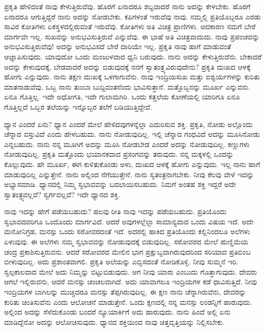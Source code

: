 ಪ್ರಕೃತಿ ಹೇಳಿದಂತೆ ನಾವು ಕೇಳುತ್ತಿರುವೆವು. ಹೊರಗೆ ಏನಾದರೂ ಶಬ್ದವಾದರೆ ನಾನು ಅದನ್ನು ಕೇಳಬೇಕು. ಹೊರಗೆ ಏನಾದರೂ ಆಗುತ್ತಿದ್ದರೆ ನಾನು ಅದನ್ನು ನೋಡಬೇಕು. ಕಪಿಗಳಂತೆ ಇರುವೆವು ನಾವು. ನಮ್ಮಲ್ಲಿ ಪ್ರತಿಯೊಬ್ಬರೂ ಎರಡು ಸಾವಿರ ಕೋತಿಗಳು ಏಕಸ್ಥಳದಲ್ಲಿರುವಂತೆ ಇರುವೆವು. ಕೋತಿಗಳು ಅತಿ ವಿಚಿತ್ರ ಪ್ರಾಣಿಗಳು. ಆದಕಾರಣ ನಮಗೆ ಬೇರೆ ಮಾರ್ಗವೇ ಇಲ್ಲ. ಸುಖವನ್ನು ಅನುಭವಿಸುತ್ತಿರುವೆ ಎನ್ನುವೆವು. ಈ ಭಾಷೆ ಅತಿ ವಿಚಿತ್ರವಾದುದು. ನಾವು ಪ್ರಪಂಚವನ್ನು ಅನುಭವಿಸುತ್ತಿರುವೆವು! ಅದನ್ನು ಅನುಭವಿಸದೆ ಬೇರೆ ದಾರಿಯೇ ಇಲ್ಲ. ಪ್ರಕೃತಿ ನಾವು ಹಾಗೆ ಮಾಡುವಂತೆ ಆಜ್ಞಾಪಿಸುವುದು. ಯಾವುದೋ ಒಂದು ಮಂಜುಳವಾದ ಧ್ವನಿ ಬರುವುದು. ನಾನು ಅದನ್ನು ಕೇಳುತ್ತಿರುವೆನು. ಬೇಕಾದರೆ ಅದನ್ನು ಕೇಳುವುದಕ್ಕೆ, ಬೇಡವಾದರೆ ಅದನ್ನು ಬಿಡುವುದಕ್ಕೆ ನನಗೆ ಸ್ವಾತಂತ್ರ್ಯವಿರುವುದೇನು? ಪ್ರಕೃತಿ ದುಃಖದ ಆಳಕ್ಕೆ ಹೋಗು ಎನ್ನುವುದು. ನಾನು ತಕ್ಷಣ ದುಃಖಕ್ಕೆ ಒಳಗಾಗುವೆನು. ನಾವು ಇಂದ್ರಿಯಸುಖ ಮತ್ತು ಐಶ್ವರ್ಯಗಳನ್ನು ಕುರಿತು ಮಾತನಾಡುವೆವು. ಒಬ್ಬ ನಾನು ತುಂಬಾ ಬುದ್ದಿವಂತನೆಂದು ಭಾವಿಸುತ್ತಾನೆ. ಮತ್ತೊಬ್ಬನನ್ನು ಮೂರ್ಖ ಎನ್ನುವನು. ಏನೂ ಗೊತ್ತಿಲ್ಲ. ಇದೇ ಅಧೋಗತಿ, ಇದೇ ಗುಲಾಮಗಿರಿ. ಒಂದು ಕತ್ತಲೆಯ ಕೋಣೆಯಲ್ಲಿ ಯಾರಿಗೂ ಏನೂ ಗೊತ್ತಿಲ್ಲದೆ ಒಬ್ಬರ ತಲೆಯನ್ನು ಇನ್ನೊಬ್ಬರ ತಲೆಗೆ ಬಡಿಯುತ್ತಿದ್ದೇವೆ.

ಧ್ಯಾನ ಎಂದರೆ ಏನು? ಧ್ಯಾನ ಎಂದರೆ ಮೇಲೆ ಹೇಳಿದವುಗಳನ್ನೆಲ್ಲಾ ಎದುರಿಸುವ ಶಕ್ತಿ. ಪ್ರಕೃತಿ, ನೋಡು ಅಲ್ಲೊಂದು ಚೆನ್ನಾದ ವಸ್ತುವಿದೆ ಎಂದು ಹೇಳಬಹುದು. ನಾನು ನೋಡುವುದಿಲ್ಲ. ಇಲ್ಲಿ ಚೆನ್ನಾದ ಗಂಧವಿದೆ ಅದನ್ನು ಮೂಸಿನೋಡು ಎನ್ನಬಹುದು. ನಾನು ನನ್ನ ಮೂಗಿಗೆ ಅದನ್ನು ಮೂಸಿ ನೋಡಬೇಡ ಎಂದರೆ ಅದನ್ನು ನೋಡುವುದಿಲ್ಲ. ಕಣ್ಣುಗಳು ನೋಡುವುದಿಲ್ಲ. ಪ್ರಕೃತಿ ಮತ್ತೊಂದು ಭಯಾನಕವಾದ ಪ್ರಸಂಗವನ್ನು ತರುವುದು. ನನ್ನ ಮಕ್ಕಳಲ್ಲಿ ಒಂದನ್ನು ಕೊಲ್ಲುವುದು. ಹೇ ಮೂರ್ಖ, ಈಗ ಕುಳಿತುಕೊಂಡು ಅಳು, ದುಃಖದ ಆಳಕ್ಕೆ ಹೋಗು ಎನ್ನುವುದು. ಇಲ್ಲ ನಾನು ಹಾಗೆ ಮಾಡುವುದಿಲ್ಲ ಎನ್ನುತ್ತೇನೆ. ನಾನು ಅಲ್ಲಿಂದ ನೆಗೆಯುತ್ತೇನೆ. ನಾನು ಸ್ವತಂತ್ರನಾಗಬೇಕು. ನೀವು ಕೆಲವು ವೇಳೆ ಇದನ್ನು ಅಭ್ಯಾಸಮಾಡಿ. ಧ್ಯಾನದಲ್ಲಿ ನಿಮ್ಮ ಸ್ವಭಾವವನ್ನು ಬದಲಾಯಿಸಬಹುದು. ನಿಮಗೆ ಅಂತಹ ಶಕ್ತಿ ಇದ್ದರೆ ಅದೇ ಸ್ವಾತಂತ್ರ್ಯವಲ್ಲವೆ? ಸ್ವರ್ಗವಲ್ಲವೆ? ಇದೇ ಧ್ಯಾನದ ಶಕ್ತಿ.

ನಾವು ಇದನ್ನು ಹೇಗೆ ಪಡೆಯಬಹುದು? ಹಲವು ರೀತಿ ನಾವು ಇದನ್ನು ಪಡೆಯಬಹುದು. ಪ್ರತಿಯೊಂದು ಸ್ವಭಾವದವರಿಗೂ ಒಂದೊಂದು ಮಾರ್ಗವಿದೆ. ಆದರೆ ಅವುಗಳಲ್ಲೆಲ್ಲಾ ಸಾಮಾನ್ಯವಾದ ಒಂದು ವಿಷಯ ಇದೆ. ಅದೇ ಮನೋನಿಗ್ರಹ, ಮನಸ್ಸು ಒಂದು ಸರೋವರದಂತೆ ಇದೆ. ಅದರಲ್ಲಿ ಹಾಕಿದ ಪ್ರತಿಯೊಂದು ಕಲ್ಲಿನಿಂದಲೂ ಅಲೆಗಳು ಏಳುವುವು. ಈ ಅಲೆಗಳು ನಮ್ಮ ಸ್ವಭಾವವನ್ನು ನೋಡುವುದಕ್ಕೆ ಬಿಡುವುದಿಲ್ಲ. ಸರೋವರದ ಮೇಲೆ ಹುಣ್ಣಿಮೆಯ ಚಂದ್ರ ಪ್ರಕಾಶಿಸುತ್ತಿರುವನು. ಆದರೆ ಸರೋವರದ ಮೇಲಿನ ಭಾಗ ಪ್ರಕ್ಷುಬ್ದವಾಗಿರುವುದರಿಂದ ಸರಿಯಾದ ಪ್ರತಿಬಿಂಬ ಬೀಳುವುದಿಲ್ಲ. ಅದು ಪ್ರಶಾಂತವಾಗಲಿ. ಪ್ರಕೃತಿ ಅಲೆಯನ್ನು ಎಬ್ಬಿಸದಂತೆ ನೋಡಿಕೊಳ್ಳಿ. ನೀವು ಸುಮ್ಮನೆ ಇರಿ. ಸ್ವಲ್ಪಕಾಲವಾದ ಮೇಲೆ ಅದು ನಿಮ್ಮನ್ನು ಬಿಟ್ಟುಬಿಡುವುದು. ಆಗ ನೀವು ಯಾರು ಎಂಬುದು ಗೊತ್ತಾಗುವುದು. ದೇವರು ಆಗಲೆ ಇಲ್ಲಿರುವನು, ಆದರೆ ಮನಸ್ಸು ಚಂಚಲವಾಗಿದೆ. ಅದು ಯಾವಾಗಲೂ ಇಂದ್ರಿಯಗಳ ಕಡೆ ಧಾವಿಸುತ್ತಿದೆ. ನೀವು ಇಂದ್ರಿಯಗಳ ಬಾಗಿಲನ್ನು ಮುಚ್ಚಿದರೂ ಮನಸ್ಸು ತೆಪ್ಪಗಿರುವುದಿಲ್ಲ. ಈ ಕ್ಷಣ ನಾನು ಚೆನ್ನಾಗಿರುವೆನು, ದೇವರನ್ನು ಕುರಿತು ಚಿಂತಿಸುವೆನು ಎಂದು ಆಲೋಚನೆ ಮಾಡುತ್ತೇನೆ. ಒಂದು ಕ್ಷಣದಲ್ಲಿ ನನ್ನ ಮನಸ್ಸು ಲಂಡನ್ನಿಗೆ ಹಾರುವುದು. ಅಲ್ಲಿಂದ ಅದನ್ನು ಸೆಳೆದುಕೊಂಡು ಬಂದರೆ ನ್ಯೂಯಾರ್ಕಿಗೆ ಅದು ಹಾರುವುದು. ನಾನು ಹಿಂದೆ ಅಲ್ಲಿ ಏನು ಮಾಡಿದ್ದೆನೋ ಅದನ್ನು ಆಲೋಚಿಸುವುದು. ಧ್ಯಾನದ ಶಕ್ತಿಯಿಂದ ನಾವು ಚಿತ್ತವೃತ್ತಿಯನ್ನು ನಿಲ್ಲಿಸಬೇಕು.

